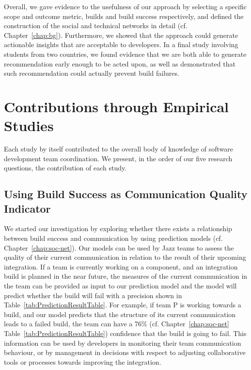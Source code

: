 Overall, we gave evidence to the usefulness of our approach by selecting a specific scope and outcome metric, builds and build success respectively, and defined the construction of the social and technical networks in detail (cf. Chapter~\ref{chap:bg}).
Furthermore, we showed that the approach could generate actionable insights that are acceptable to developers.
In a final study involving students from two countries, we found evidence that we are both able to generate recommendation early enough to be acted upon, as well as demonstrated that such recommendation could actually prevent build failures.



\section{Contributions through Empirical Studies}
\label{sec:cont:emp}
Each study by itself contributed to the overall body of knowledge of software development team coordination.
We present, in the order of our five research questions, the contribution of each  study.


\subsection{Using Build Success as Communication Quality Indicator}
\label{subsec:practicalimpl}
%
We started our investigation by exploring whether there exists a relationship between build success and communication by using prediction models (cf. Chapter~\ref{chap:soc-net}).
Our models can be used by Jazz teams to assess the quality of their current
communication in relation to the result of their upcoming integration. If a team
is currently working on a component, and an integration build is planned in the
near future, the measures of the current communication in the team can be
provided as input to our prediction model and the model will predict whether the
build will fail with a precision shown in Table~\ref{tab:PredictionResultTable}.
For example, if team P is working towards a build, and our model predicts that the
structure of its current communication leads to a failed build, the team can have
a 76\% (cf. Chapter~\ref{chap:soc-net} Table~\ref{tab:PredictionResultTable}) confidence that the build is
going to fail. This information can be used by developers in monitoring their
team communication behaviour, or by management in decisions with respect to
adjusting collaborative tools or processes towards improving the integration.

